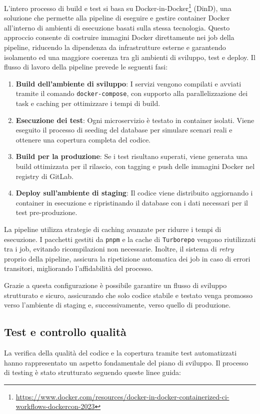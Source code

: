 L'intero processo di build e test si basa su Docker-in-Docker\footnote{\url{https://www.docker.com/resources/docker-in-docker-containerized-ci-workflows-dockercon-2023}} (DinD), una soluzione che permette alla pipeline di eseguire e gestire container Docker all'interno di ambienti di esecuzione basati sulla stessa tecnologia. Questo approccio consente di costruire immagini Docker direttamente nei job della pipeline, riducendo la dipendenza da infrastrutture esterne e garantendo isolamento ed una maggiore coerenza tra gli ambienti di sviluppo, test e deploy.
%
Il flusso di lavoro della pipeline prevede le seguenti fasi:
\begin{enumerate}
  \item \textbf{Build dell'ambiente di sviluppo}: I servizi vengono compilati e avviati tramite il comando \texttt{docker-compose}, con supporto alla parallelizzazione dei task e caching per ottimizzare i tempi di build.
  \item \textbf{Esecuzione dei test}: Ogni microservizio è testato in container isolati. Viene eseguito il processo di seeding del database per simulare scenari reali e ottenere una copertura completa del codice.
  \item \textbf{Build per la produzione}: Se i test risultano superati, viene generata una build ottimizzata per il rilascio, con tagging e push delle immagini Docker nel registry di GitLab.
  \item \textbf{Deploy sull'ambiente di staging}: Il codice viene distribuito aggiornando i container in esecuzione e ripristinando il database con i dati necessari per il test pre-produzione.
\end{enumerate}

La pipeline utilizza strategie di caching avanzate per ridurre i tempi di esecuzione. I pacchetti gestiti da \texttt{pnpm} e la cache di \texttt{Turborepo} vengono riutilizzati tra i job, evitando ricompilazioni non necessarie. Inoltre, il sistema di \textit{retry} proprio della pipeline, assicura la ripetizione automatica dei job in caso di errori transitori, migliorando l'affidabilità del processo.

Grazie a questa configurazione è possibile garantire un flusso di sviluppo strutturato e sicuro, assicurando che solo codice stabile e testato venga promosso verso l'ambiente di staging e, successivamente, verso quello di produzione.

\subsection{Test e controllo qualità}
La verifica della qualità del codice e la copertura tramite test automatizzati hanno rappresentato un aspetto fondamentale del piano di sviluppo. Il processo di testing è stato strutturato seguendo queste linee guida:

